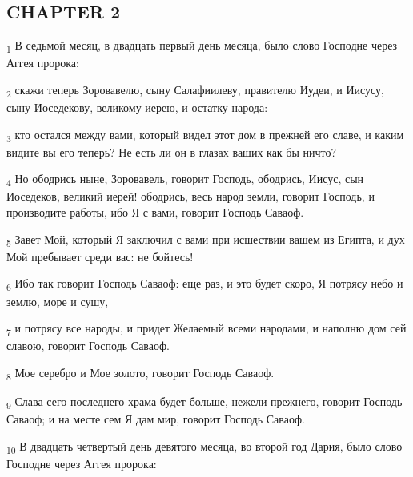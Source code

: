 \subsection{CHAPTER 2}
\begin{tcolorbox}
\textsubscript{1} В седьмой месяц, в двадцать первый день месяца, было слово Господне через Аггея пророка:
\end{tcolorbox}
\begin{tcolorbox}
\textsubscript{2} скажи теперь Зоровавелю, сыну Салафиилеву, правителю Иудеи, и Иисусу, сыну Иоседекову, великому иерею, и остатку народа:
\end{tcolorbox}
\begin{tcolorbox}
\textsubscript{3} кто остался между вами, который видел этот дом в прежней его славе, и каким видите вы его теперь? Не есть ли он в глазах ваших как бы ничто?
\end{tcolorbox}
\begin{tcolorbox}
\textsubscript{4} Но ободрись ныне, Зоровавель, говорит Господь, ободрись, Иисус, сын Иоседеков, великий иерей! ободрись, весь народ земли, говорит Господь, и производите работы, ибо Я с вами, говорит Господь Саваоф.
\end{tcolorbox}
\begin{tcolorbox}
\textsubscript{5} Завет Мой, который Я заключил с вами при исшествии вашем из Египта, и дух Мой пребывает среди вас: не бойтесь!
\end{tcolorbox}
\begin{tcolorbox}
\textsubscript{6} Ибо так говорит Господь Саваоф: еще раз, и это будет скоро, Я потрясу небо и землю, море и сушу,
\end{tcolorbox}
\begin{tcolorbox}
\textsubscript{7} и потрясу все народы, и придет Желаемый всеми народами, и наполню дом сей славою, говорит Господь Саваоф.
\end{tcolorbox}
\begin{tcolorbox}
\textsubscript{8} Мое серебро и Мое золото, говорит Господь Саваоф.
\end{tcolorbox}
\begin{tcolorbox}
\textsubscript{9} Слава сего последнего храма будет больше, нежели прежнего, говорит Господь Саваоф; и на месте сем Я дам мир, говорит Господь Саваоф.
\end{tcolorbox}
\begin{tcolorbox}
\textsubscript{10} В двадцать четвертый день девятого месяца, во второй год Дария, было слово Господне через Аггея пророка:
\end{tcolorbox}
